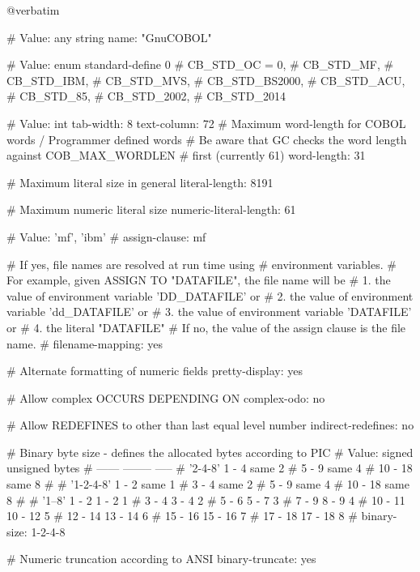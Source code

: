@verbatim


# Value: any string
name: "GnuCOBOL"

# Value: enum
standard-define			0
#        CB_STD_OC = 0,
#        CB_STD_MF,
#        CB_STD_IBM,
#        CB_STD_MVS,
#        CB_STD_BS2000,
#        CB_STD_ACU,
#        CB_STD_85,
#        CB_STD_2002,
#        CB_STD_2014

# Value: int
tab-width:			8
text-column:			72
# Maximum word-length for COBOL words / Programmer defined words
# Be aware that GC checks the word length against COB_MAX_WORDLEN
# first (currently 61)
word-length:			31

# Maximum literal size in general
literal-length:			8191

# Maximum numeric literal size
numeric-literal-length:	61

# Value: 'mf', 'ibm'
#
assign-clause:			mf

# If yes, file names are resolved at run time using
# environment variables.
# For example, given ASSIGN TO "DATAFILE", the file name will be
#  1. the value of environment variable 'DD_DATAFILE' or
#  2. the value of environment variable 'dd_DATAFILE' or
#  3. the value of environment variable 'DATAFILE' or
#  4. the literal "DATAFILE"
# If no, the value of the assign clause is the file name.
#
filename-mapping:		yes

# Alternate formatting of numeric fields
pretty-display:			yes

# Allow complex OCCURS DEPENDING ON
complex-odo:			no

# Allow REDEFINES to other than last equal level number
indirect-redefines:		no

# Binary byte size - defines the allocated bytes according to PIC
# Value:         signed  unsigned  bytes
#                ------  --------  -----
# '2-4-8'        1 -  4    same        2
#                5 -  9    same        4
#               10 - 18    same        8
#
# '1-2-4-8'      1 -  2    same        1
#                3 -  4    same        2
#                5 -  9    same        4
#               10 - 18    same        8
#
# '1--8'         1 -  2    1 -  2      1
#                3 -  4    3 -  4      2
#                5 -  6    5 -  7      3
#                7 -  9    8 -  9      4
#               10 - 11   10 - 12      5
#               12 - 14   13 - 14      6
#               15 - 16   15 - 16      7
#               17 - 18   17 - 18      8
#
binary-size:			1-2-4-8

# Numeric truncation according to ANSI
binary-truncate:		yes

